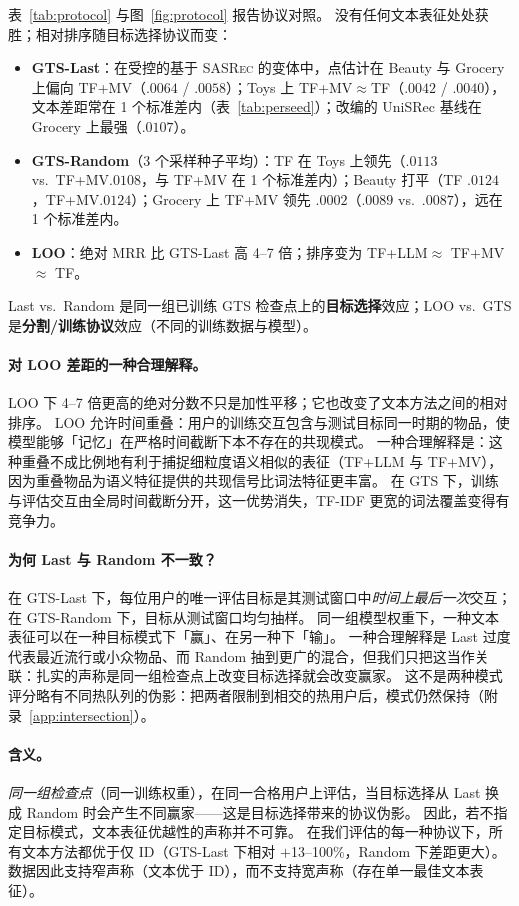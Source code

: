 \documentclass[sigconf,natbib=true,anonymous]{acmart}
\newcommand{\tfidf}{\textsc{TF-IDF}\xspace}
\newcommand{\tfllm}{\textsc{TF+LLM}\xspace}
\newcommand{\tfmv}{\textsc{TF+MV}\xspace}
\newcommand{\base}{\textsc{SASRec}\xspace}
\begin{document}
表~\ref{tab:protocol} 与图~\ref{fig:protocol} 报告协议对照。
没有任何文本表征处处获胜；相对排序随目标选择协议而变：

\begin{itemize}[leftmargin=*,itemsep=1pt]
\item \textbf{GTS-Last}：在受控的基于 \base 的变体中，点估计在 Beauty 与 Grocery 上偏向 \tfmv（$.0064$ / $.0058$）；Toys 上 TF+MV${}\approx{}$TF（$.0042$ / $.0040$），文本差距常在 1 个标准差内（表~\ref{tab:perseed}）；改编的 UniSRec 基线在 Grocery 上最强（$.0107$）。
\item \textbf{GTS-Random}（3 个采样种子平均）：TF 在 Toys 上领先（$.0113$ vs.\ \tfmv $.0108$，与 \tfmv 在 1 个标准差内）；Beauty 打平（TF $.0124$，\tfmv $.0124$）；Grocery 上 \tfmv 领先 $.0002$（$.0089$ vs.\ $.0087$），远在 1 个标准差内。
\item \textbf{LOO}：绝对 MRR 比 GTS-Last 高 4--7 倍；排序变为 \tfllm $\approx$ \tfmv $\approx$ TF。
\end{itemize}
Last vs.\ Random 是同一组已训练 GTS 检查点上的\textbf{目标选择}效应；LOO vs.\ GTS 是\textbf{分割/训练协议}效应（不同的训练数据与模型）。

\paragraph{对 LOO 差距的一种合理解释。}
LOO 下 4--7 倍更高的绝对分数不只是加性平移；它也改变了文本方法之间的相对排序。
LOO 允许时间重叠：用户的训练交互包含与测试目标同一时期的物品，使模型能够「记忆」在严格时间截断下本不存在的共现模式。
一种合理解释是：这种重叠不成比例地有利于捕捉细粒度语义相似的表征（\tfllm 与 \tfmv），因为重叠物品为语义特征提供的共现信号比词法特征更丰富。
在 GTS 下，训练与评估交互由全局时间截断分开，这一优势消失，\tfidf 更宽的词法覆盖变得有竞争力。

\paragraph{为何 Last 与 Random 不一致？}
在 GTS-Last 下，每位用户的唯一评估目标是其测试窗口中\emph{时间上最后一次}交互；在 GTS-Random 下，目标从测试窗口均匀抽样。
同一组模型权重下，一种文本表征可以在一种目标模式下「赢」、在另一种下「输」。
一种合理解释是 Last 过度代表最近流行或小众物品、而 Random 抽到更广的混合，但我们只把这当作关联：扎实的声称是同一组检查点上改变目标选择就会改变赢家。
这不是两种模式评分略有不同热队列的伪影：把两者限制到相交的热用户后，模式仍然保持（附录~\ref{app:intersection}）。

\paragraph{含义。}
\emph{同一组检查点}（同一训练权重），在同一合格用户上评估，当目标选择从 Last 换成 Random 时会产生不同赢家——这是目标选择带来的协议伪影。
因此，若不指定目标模式，文本表征优越性的声称并不可靠。
在我们评估的每一种协议下，所有文本方法都优于仅 ID（GTS-Last 下相对 $+$13--100\%，Random 下差距更大）。
数据因此支持窄声称（文本优于 ID），而不支持宽声称（存在单一最佳文本表征）。
\end{document}
